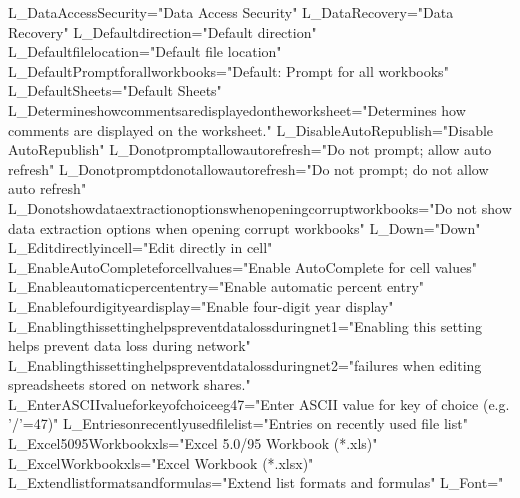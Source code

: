 
 L _ D a t a A c c e s s S e c u r i t y = " D a t a   A c c e s s   S e c u r i t y " 
 
 L _ D a t a R e c o v e r y = " D a t a   R e c o v e r y " 
 
 L _ D e f a u l t d i r e c t i o n = " D e f a u l t   d i r e c t i o n " 
 
 L _ D e f a u l t f i l e l o c a t i o n = " D e f a u l t   f i l e   l o c a t i o n " 
 
 L _ D e f a u l t P r o m p t f o r a l l w o r k b o o k s = " D e f a u l t :   P r o m p t   f o r   a l l   w o r k b o o k s " 
 
 L _ D e f a u l t S h e e t s = " D e f a u l t   S h e e t s " 
 
 L _ D e t e r m i n e s h o w c o m m e n t s a r e d i s p l a y e d o n t h e w o r k s h e e t = " D e t e r m i n e s   h o w   c o m m e n t s   a r e   d i s p l a y e d   o n   t h e   w o r k s h e e t . " 
 
 L _ D i s a b l e A u t o R e p u b l i s h = " D i s a b l e   A u t o R e p u b l i s h " 
 
 L _ D o n o t p r o m p t a l l o w a u t o r e f r e s h = " D o   n o t   p r o m p t ;   a l l o w   a u t o   r e f r e s h " 
 
 L _ D o n o t p r o m p t d o n o t a l l o w a u t o r e f r e s h = " D o   n o t   p r o m p t ;   d o   n o t   a l l o w   a u t o   r e f r e s h " 
 
 L _ D o n o t s h o w d a t a e x t r a c t i o n o p t i o n s w h e n o p e n i n g c o r r u p t w o r k b o o k s = " D o   n o t   s h o w   d a t a   e x t r a c t i o n   o p t i o n s   w h e n   o p e n i n g   c o r r u p t   w o r k b o o k s " 
 
 L _ D o w n = " D o w n " 
 
 L _ E d i t d i r e c t l y i n c e l l = " E d i t   d i r e c t l y   i n   c e l l " 
 
 L _ E n a b l e A u t o C o m p l e t e f o r c e l l v a l u e s = " E n a b l e   A u t o C o m p l e t e   f o r   c e l l   v a l u e s " 
 
 L _ E n a b l e a u t o m a t i c p e r c e n t e n t r y = " E n a b l e   a u t o m a t i c   p e r c e n t   e n t r y " 
 
 L _ E n a b l e f o u r d i g i t y e a r d i s p l a y = " E n a b l e   f o u r - d i g i t   y e a r   d i s p l a y " 
 
 L _ E n a b l i n g t h i s s e t t i n g h e l p s p r e v e n t d a t a l o s s d u r i n g n e t 1 = " E n a b l i n g   t h i s   s e t t i n g   h e l p s   p r e v e n t   d a t a   l o s s   d u r i n g   n e t w o r k " 
 
 L _ E n a b l i n g t h i s s e t t i n g h e l p s p r e v e n t d a t a l o s s d u r i n g n e t 2 = " f a i l u r e s   w h e n   e d i t i n g   s p r e a d s h e e t s   s t o r e d   o n   n e t w o r k   s h a r e s . " 
 
 L _ E n t e r A S C I I v a l u e f o r k e y o f c h o i c e e g 4 7 = " E n t e r   A S C I I   v a l u e   f o r   k e y   o f   c h o i c e   ( e . g .   ' / ' = 4 7 ) " 
 
 L _ E n t r i e s o n r e c e n t l y u s e d f i l e l i s t = " E n t r i e s   o n   r e c e n t l y   u s e d   f i l e   l i s t " 
 
 L _ E x c e l 5 0 9 5 W o r k b o o k x l s = " E x c e l   5 . 0 / 9 5   W o r k b o o k   ( * . x l s ) " 
 
 L _ E x c e l W o r k b o o k x l s = " E x c e l   W o r k b o o k   ( * . x l s x ) " 
 
 L _ E x t e n d l i s t f o r m a t s a n d f o r m u l a s = " E x t e n d   l i s t   f o r m a t s   a n d   f o r m u l a s " 
 
 L _ F o n t = "